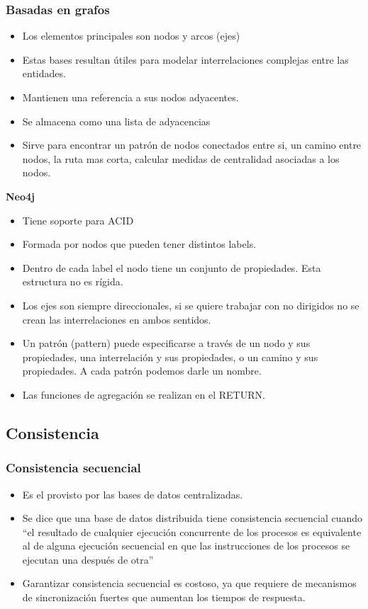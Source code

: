 \subsubsection*{Basadas en grafos}
\begin{itemize}
\item Los elementos principales son nodos y arcos (ejes)
\item Estas bases resultan útiles para modelar interrelaciones complejas entre las entidades.
\item Mantienen una referencia a sus nodos adyacentes.
\item Se almacena como una lista de adyacencias
\item Sirve para encontrar un patrón de nodos conectados entre si, un camino entre nodos, la ruta mas corta, calcular medidas de centralidad asociadas a los nodos.
\end{itemize}


\bigskip
\textbf{Neo4j}\\
\begin{itemize}
\item Tiene soporte para ACID
\item Formada por nodos que pueden tener distintos labels. 
\item Dentro de cada label el nodo tiene un conjunto de propiedades. Esta estructura no es rígida.
\item Los ejes son siempre direccionales, si se quiere trabajar con no dirigidos no se crean las interrelaciones en ambos sentidos.
\item Un patrón (pattern) puede especificarse a través de un nodo y sus propiedades, una interrelación y sus propiedades, o un camino y sus propiedades. A cada patrón podemos darle un nombre. 
\item Las funciones de agregación se realizan en el RETURN.
\end{itemize}

\subsection*{Consistencia}
\subsubsection*{Consistencia secuencial}

\begin{itemize}
\item Es el provisto por las bases de datos centralizadas.
\item Se dice que una base de datos distribuida tiene consistencia secuencial cuando “el resultado de cualquier ejecución concurrente de los procesos es equivalente al de alguna ejecución secuencial en que las instrucciones de los procesos se ejecutan una después de otra”
\item Garantizar consistencia secuencial es costoso, ya que requiere de mecanismos de sincronización fuertes que aumentan los tiempos de respuesta.
\end{itemize}

